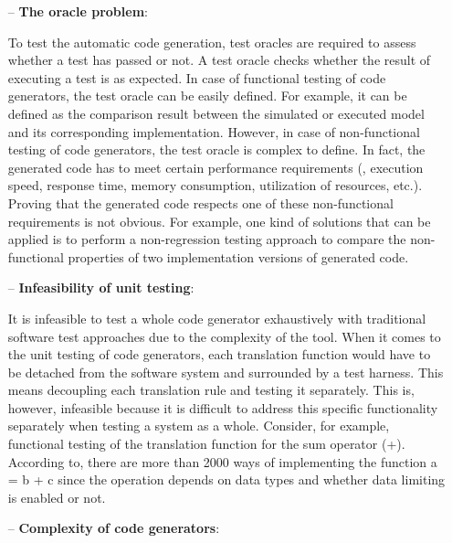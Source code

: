 \begin{itemize}
	\item[--] \textbf{The oracle problem}: 
	
	To test the automatic code generation, test oracles are required to assess whether a test has passed or not. A test
	oracle checks whether the result of executing a test is as expected.
	In case of functional testing of code generators, the test oracle can be easily defined. For example, it can be defined as the comparison result between the simulated or executed model and its corresponding implementation. 
	However, in case of non-functional testing of code generators, the test oracle is complex to define. In fact, the generated code has to meet certain performance requirements (\eg, execution speed, response time, memory consumption, utilization of resources, etc.). Proving that the generated code respects one of these non-functional requirements is not obvious. For example, one kind of solutions that can be applied is to perform a non-regression testing approach to compare the non-functional properties of two implementation versions of generated code.
	
	\item[--] \textbf{Infeasibility of unit testing}:
	 
	It is infeasible to test a whole code generator exhaustively with traditional software test approaches due to the complexity of the tool. When it comes to the unit testing of code generators, each translation function would have to be detached from the software system and surrounded by a test harness. This means decoupling each translation rule and testing it separately. This is, however, infeasible because it is difficult to address this specific functionality separately when testing a system as a whole. 
	Consider, for example, functional testing of the translation function for the sum operator (+). According to\cite{burnard2004verifying}, there are more than \num{2000} ways of implementing the function a = b + c since the operation depends on data types and whether data limiting is enabled or not.
		
	\item[--] \textbf{Complexity of code generators}: 
	

\end{itemize}
